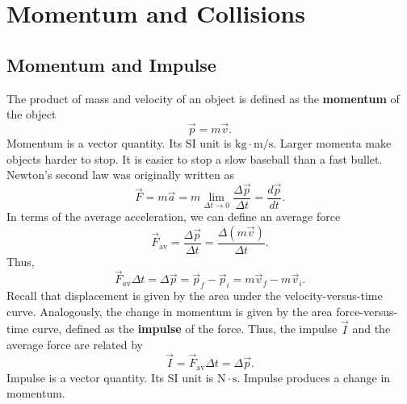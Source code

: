 \documentclass[11pt,letter]{report}
\begin{document}
\chapter*{Momentum and Collisions}

\section{Momentum and Impulse}
The product of mass and velocity of an object is defined as the \textbf{momentum} of the object $$\vec{p} = m \vec{v}.$$
Momentum is a vector quantity. Its SI unit is $\mathrm{kg} \cdot \mathrm{m}/\mathrm{s}$. Larger momenta make objects harder to stop.
It is easier to stop a slow baseball than a fast bullet.
\\Newton's second law was originally written as $$\vec{F} = m \vec{a} = m \lim_{\Delta{t} \to 0}{\frac{\Delta{\vec{p}}}{\Delta{t}}} = \frac{d\vec{p}}{dt}.$$ In terms of the average acceleration, we can define an average force $$\vec{F}_\mathrm{av} = \frac{\Delta{\vec{p}}}{\Delta{t}} = \frac{\Delta{\left(m \vec{v}\right)}}{\Delta{t}}.$$
Thus, $$\vec{F}_{a\mathrm{v}} \Delta{t} = \Delta{\vec{p}} = \vec{p}_f - \vec{p}_i = m \vec{v}_f - m \vec{v}_i.$$
Recall that displacement is given by the area under the velocity-versus-time curve. Analogously, the change in momentum is given by the area force-versus-time curve, defined as the \textbf{impulse} of the force. Thus, the impulse $\vec{I}$ and the average force are related by $$\vec{I} = \vec{F}_\mathrm{av} \Delta{t} = \Delta{\vec{p}}.$$
Impulse is a vector quantity. Its SI unit is $\mathrm{N} \cdot \mathrm{s}$. Impulse produces a change in momentum.
\end{document}
